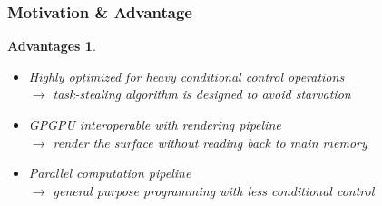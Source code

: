 \documentclass[8pt]{beamer}
\newtheorem{motivation}{Motivation}
\newtheorem{advantage}{Advantages}
\begin{document}
\begin{frame}
  \frametitle{Motivation \& Advantage}

  \begin{advantage}
    \begin{itemize}
    \item Highly optimized for heavy conditional control operations\\
      $\rightarrow$ task-stealing algorithm is designed to avoid starvation
    \end{itemize}
    \begin{itemize}
    \item GPGPU interoperable with rendering pipeline \\
      $\rightarrow$ render the surface without reading back to main
      memory
    \item Parallel computation pipeline \\
      $\rightarrow$ general purpose programming with less conditional control
    \end{itemize}
  \end{advantage}
\end{frame}
\note{}
\end{document}
